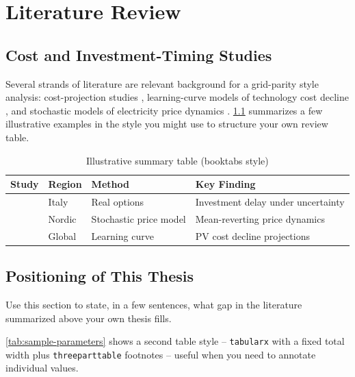 \chapter{Literature Review}
\label{chap:literature-review}


\section{Cost and Investment-Timing Studies}
Several strands of literature are relevant background for a grid-parity style analysis: cost-projection studies \citep{lorenczik2020projected}, learning-curve models of technology cost decline \citep{breyer2013economics}, and stochastic models of electricity price dynamics \citep{lucia2002electricity,gianfreda2010volatility}. \cref{tab:sample-studies} summarizes a few illustrative examples in the style you might use to structure your own review table.

\begin{table}[H]
\centering
\caption{Illustrative summary table (booktabs style)}
\label{tab:sample-studies}
\begin{tabular}{ll>{\raggedright\arraybackslash}m{2.6cm}>{\raggedright\arraybackslash}m{3.6cm}}
\toprule
{\color{unipdblue}\bfseries Study} & {\color{unipdblue}\bfseries Region} & {\color{unipdblue}\bfseries Method} & {\color{unipdblue}\bfseries Key Finding} \\
\midrule
\citet{biondi2015solar} & Italy & Real options & Investment delay under uncertainty \\
\citet{lucia2002electricity} & Nordic & Stochastic price model & Mean-reverting price dynamics \\
\citet{breyer2013economics} & Global & Learning curve & PV cost decline projections \\
\bottomrule
\end{tabular}
\end{table}

\section{Positioning of This Thesis}
Use this section to state, in a few sentences, what gap in the literature summarized above your own thesis fills.

\cref{tab:sample-parameters} shows a second table style -- \texttt{tabularx} with a fixed total width plus \texttt{threeparttable} footnotes -- useful when you need to annotate individual values.

